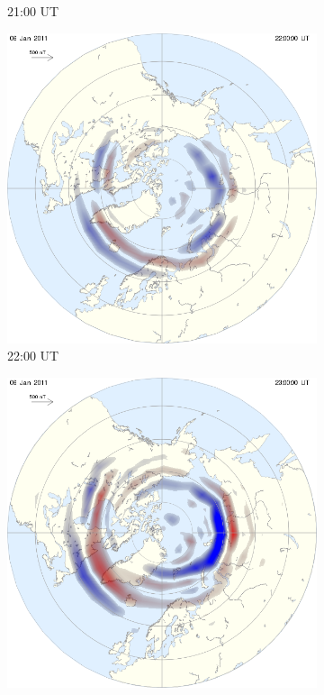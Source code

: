 \documentclass[10pt,a4paper]{article}
\begin{document}
\begin{figure}[h]
\begin{subfigure}{0.3\textwidth}
	\caption{ 21:00 UT \label{amp21}}
\end{subfigure}
\begin{subfigure}{0.3\textwidth}
\centering
	\includegraphics[width=\textwidth]{ampere4.png}
	\caption{ 22:00 UT \label{amp22}}
\end{subfigure}
\begin{subfigure}{0.3\textwidth}
\centering
	\includegraphics[width=\textwidth]{ampere5.png}

\end{subfigure}
\end{figure}
\end{document}
